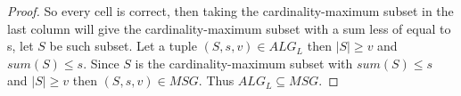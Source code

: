 \begin{proof}
    So every cell is correct, then taking the cardinality-maximum subset in the last column will give the 
    cardinality-maximum subset with a sum less of equal to s, let $S$ be such subset.
    Let a tuple $(S,s,v) \in ALG_L$ then $|S| \ge v$ and $sum(S) \le s$.
    Since $S$ is the cardinality-maximum subset with $sum(S) \le s$ and $|S| \ge v$ then $(S,s,v) \in MSG$.
    Thus $ALG_L \subseteq MSG$.  
\end{proof}